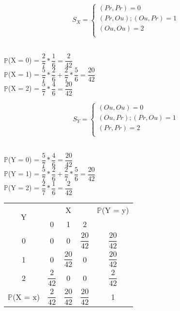 \documentclass[12pt,a4paper]{article}
\begin{document}
	\vspace{1cm}
		\[
	S_{X} =
	\begin{cases}
	(Pr, Pr) = 0\\
	(Pr, Ou); (Ou, Pr) = 1\\
	(Ou, Ou) = 2\\
	\end{cases}
	\]
	\vspace{0.5cm}\\
	\begin{center}
		$\mathbb{P}$(X = 0) = $\dfrac{2}{7} * \dfrac{1}{6} = \dfrac{2}{42}$
		\vspace{0.5cm}\\
		$\mathbb{P}$(X = 1) = $\dfrac{5}{7} * \dfrac{2}{6} + \dfrac{2}{7} * \dfrac{5}{6} = \dfrac{20}{42}$
		\vspace{0.5cm}\\
		$\mathbb{P}$(X = 2) = $\dfrac{5}{7} * \dfrac{4}{6} = \dfrac{20}{42}$
	\end{center}
	\vspace{0.5cm}
	\[
	S_{Y} =
	\begin{cases}
	(Ou, Ou) = 0\\
	(Ou, Pr); (Pr, Ou) = 1\\
	(Pr, Pr) = 2\\
	\end{cases}
	\]
	\vspace{0.5cm}\\
	\begin{center}
		$\mathbb{P}$(Y = 0) = $\dfrac{5}{7} * \dfrac{4}{6} = \dfrac{20}{42}$
		\vspace{0.5cm}\\
		$\mathbb{P}$(Y = 1) = $\dfrac{5}{7} * \dfrac{2}{6} + \dfrac{2}{7} * \dfrac{5}{6} = \dfrac{20}{42}$
		\vspace{0.5cm}\\
		$\mathbb{P}$(Y = 2) = $\dfrac{2}{7} * \dfrac{1}{6} = \dfrac{2}{42}$
	\end{center}
	\vspace{1cm}
	\begin{center}
		\begin{tabular}{ccccc}
			\multirow{2}{*}{Y} & \multicolumn{3}{c}{X} & $\mathbb{P}$(Y = y)\\ \cmidrule{2-4}
			& 0 & 1 & 2 & \\ \midrule
			0 & 0 & 0 & $\dfrac{20}{42}$ & $\dfrac{20}{42}$ \\ \midrule
			1 & 0 & $\dfrac{20}{42}$ & 0 & $\dfrac{20}{42}$\\ \midrule
			2 & $\dfrac{2}{42}$ & 0 & 0 & $\dfrac{2}{42}$\\ \midrule
			$\mathbb{P}$(X = x) & $\dfrac{2}{42}$ & $\dfrac{20}{42}$ & $\dfrac{20}{42}$ & 1\\ \midrule
		\end{tabular}
	\end{center}
\end{document}
